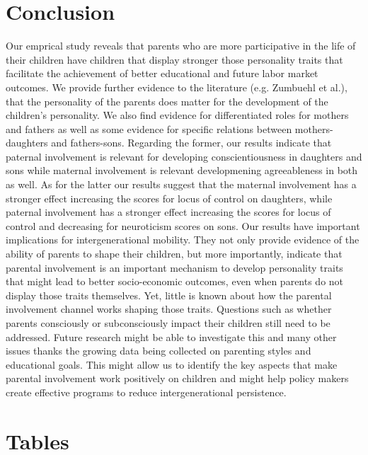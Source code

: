 \documentclass[%
    a4paper,            %
    11pt,               %
    bibliography=totoc, %
]
{scrartcl}
\begin{document}
\section{Conclusion}
Our emprical study reveals that parents who are more participative in the life of their children have children that display stronger those personality traits that facilitate the achievement of better educational and future labor market outcomes. We provide further evidence to the literature (e.g. Zumbuehl et al.), that the personality of the parents does matter for the development of the children's personality. We also find evidence for differentiated roles for mothers and fathers as well as some evidence for specific relations between mothers-daughters and fathers-sons. Regarding the former, our results indicate that paternal involvement is relevant for developing conscientiousness in daughters and sons while maternal involvement is relevant developmening agreeableness in both as well. As for the latter our results suggest that the maternal involvement has a stronger effect increasing the scores for locus of control on daughters, while paternal involvement has a stronger effect increasing the scores for locus of control and decreasing for neuroticism scores on sons. \newline
Our results have important implications for intergenerational mobility. They not only provide evidence of the ability of parents to shape their children, but more importantly, indicate that parental involvement is an important mechanism to develop personality traits that might lead to better socio-economic outcomes, even when parents do not display those traits themselves. \newline 
Yet, little is known about how the parental involvement channel works shaping those traits. Questions such as whether parents consciously or subconsciously impact their children still need to be addressed. Future research might be able to investigate this and many other issues thanks the growing data being collected on parenting styles and educational goals. This might allow us to identify the key aspects that make parental involvement work positively on children and might help policy makers create effective programs to reduce intergenerational persistence.







\pagebreak
\section{Tables}
\end{document}
